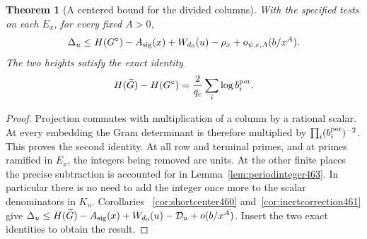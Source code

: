 \documentclass[a4paper,11pt]{article}
\newtheorem{theorem}[proposition]{Theorem}
\theoremstyle{definition}
\theoremstyle{remark}
\numberwithin{equation}{section}
\begin{document}
\begin{theorem}[A centered bound for the divided columns]\leavevmode
\label{thm:primitivegram463}
With the specified tests on each \(E_x\), for every fixed \(A>0\),
\[
       \Delta_u\le H(G^\circ)-A_{\rm sig}(x)+W_{d_0}(u)
                     -\rho_x+o_{\psi,\varepsilon,A}(b/x^A).
\]
The two heights satisfy the exact identity
\[
           H(\widetilde G)-H(G^\circ)
                  =\frac{2}{q_c}\sum_i\log b_i^{\rm per}.
\]
\end{theorem}
\begin{proof}
Projection commutes with multiplication of a column by a
rational scalar. At every embedding the Gram determinant is
therefore multiplied by \(\prod_i(b_i^{\rm per})^{-2}\).
This proves the second identity. At all row and terminal
primes, and at primes ramified in \(E_x\), the integers being
removed are units. At the other finite places the precise
subtraction is accounted for in Lemma~\ref{lem:periodinteger463}.
In particular there is no need to add the integer once more
to the scalar denominators in \(K_u\). Corollaries
~\ref{cor:shortcenter460} and~\ref{cor:inertcorrection461}
give \(\Delta_u\le H(\widetilde G)-A_{\rm sig}(x)
 +W_{d_0}(u)-\mathcal D_u+o(b/x^A)\).
Insert the two exact identities to obtain the result.
\end{proof}
\end{document}
